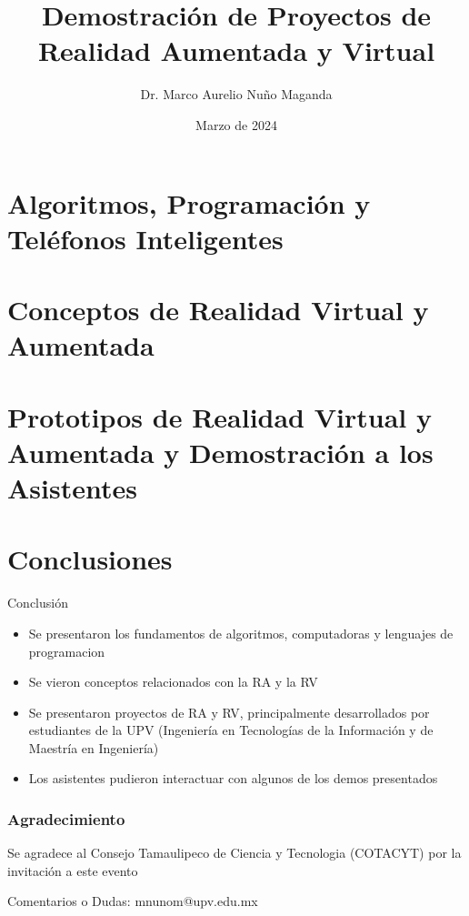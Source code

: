 \documentclass[aspectratio=169,compress]{beamer}
\title{Demostración de Proyectos de Realidad Aumentada y Virtual} %
\author{Dr. Marco Aurelio Nu\~no Maganda}
\institute{Universidad Politécnica de Victoria\\ Laboratorio de Sistemas Inteligentes \\
mnunom@upv.edu.mx  \vspace{.25cm} }
\date{Marzo de 2024}
\begin{document}
\frame{
	\begin{titlepage}
	\end{titlepage}
	
}




\section[APyTI]{Algoritmos, Programaci\'on y Tel\'efonos Inteligentes}





%


%
\section[RV y RA]{Conceptos de Realidad Virtual y Aumentada}


\section[PRVA]{Prototipos de Realidad Virtual y Aumentada y Demostraci\'on a los Asistentes}










\section[CP1]{Conclusiones}
\begin{frame}{Conclusi\'on}
\begin{itemize}
\item Se presentaron los fundamentos de algoritmos, computadoras y lenguajes de programacion 
\item Se vieron conceptos relacionados con la RA y la RV
\item Se presentaron proyectos de RA y RV, principalmente desarrollados por estudiantes de la UPV (Ingenier\'ia en Tecnolog\'ias de la Informaci\'on y de Maestría en Ingeniería)
\item Los asistentes pudieron interactuar con algunos de los demos presentados
\end{itemize}
\end{frame}

\begin{frame}
\frametitle{Agradecimiento}  
Se agradece al Consejo Tamaulipeco de Ciencia y Tecnologia (COTACYT) por la invitaci\'on a este evento

Comentarios o Dudas: mnunom@upv.edu.mx 
\end{frame}
\end{document}
